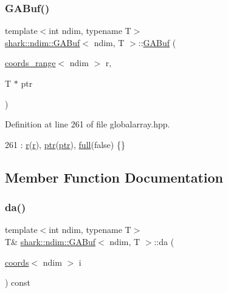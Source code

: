 \subsubsection{\texorpdfstring{G\+A\+Buf()}{GABuf()}\hspace{0.1cm}{\footnotesize\ttfamily [2/2]}}
{\footnotesize\ttfamily template$<$int ndim, typename T$>$ \\
\hyperlink{classshark_1_1ndim_1_1_g_a_buf}{shark\+::ndim\+::\+G\+A\+Buf}$<$ ndim, T $>$\+::\hyperlink{classshark_1_1ndim_1_1_g_a_buf}{G\+A\+Buf} (\begin{DoxyParamCaption}\item[{\hyperlink{structshark_1_1ndim_1_1coords__range}{coords\+\_\+range}$<$ ndim $>$}]{r,  }\item[{T $\ast$}]{ptr }\end{DoxyParamCaption})\hspace{0.3cm}{\ttfamily [inline]}}



Definition at line 261 of file globalarray.\+hpp.


\begin{DoxyCode}
261 : \hyperlink{classshark_1_1ndim_1_1_g_a_buf_ad956cb661d537077c40362c8bc371ddf}{r}(\hyperlink{classshark_1_1ndim_1_1_g_a_buf_ad956cb661d537077c40362c8bc371ddf}{r}), \hyperlink{classshark_1_1ndim_1_1_g_a_buf_a97b125250ee5edfc8c9f5c3663928421}{ptr}(\hyperlink{classshark_1_1ndim_1_1_g_a_buf_a97b125250ee5edfc8c9f5c3663928421}{ptr}), \hyperlink{classshark_1_1ndim_1_1_g_a_buf_ac5dd94b05ab78e812b0831dbb2651584}{full}(\textcolor{keyword}{false}) \{\}
\end{DoxyCode}


\subsection{Member Function Documentation}
\hypertarget{classshark_1_1ndim_1_1_g_a_buf_a748bf80c4d30d646c8368db7a7c57acf}{}\label{classshark_1_1ndim_1_1_g_a_buf_a748bf80c4d30d646c8368db7a7c57acf} 
\subsubsection{\texorpdfstring{da()}{da()}}
{\footnotesize\ttfamily template$<$int ndim, typename T$>$ \\
T\& \hyperlink{classshark_1_1ndim_1_1_g_a_buf}{shark\+::ndim\+::\+G\+A\+Buf}$<$ ndim, T $>$\+::da (\begin{DoxyParamCaption}\item[{\hyperlink{structshark_1_1ndim_1_1coords}{coords}$<$ ndim $>$}]{i }\end{DoxyParamCaption}) const\hspace{0.3cm}{\ttfamily [inline]}}



